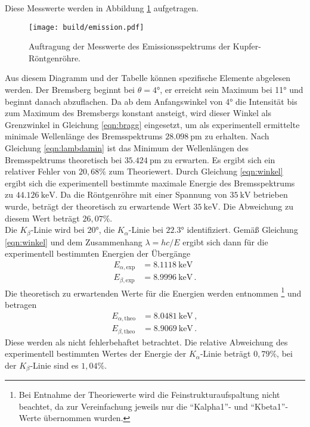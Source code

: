 Diese Messwerte werden in Abbildung \ref{fig:emission} aufgetragen.

\begin{figure}
  \centering
  \texttt{[image: build/emission.pdf]}
  \caption{Auftragung der Messwerte des Emissionsspektrums der Kupfer-Röntgenröhre.}
  \label{fig:emission}
\end{figure}

Aus diesem Diagramm und der Tabelle können spezifische Elemente abgelesen werden.
Der Bremsberg beginnt bei $\theta = 4°$, er erreicht sein Maximum bei 11° und beginnt danach abzuflachen.
Da ab dem Anfangswinkel von 4° die Intensität bis zum Maximum des Bremsbergs konstant
ansteigt, wird dieser Winkel als Grenzwinkel in Gleichung \eqref{eqn:bragg} eingesetzt, um als experimentell ermittelte minimale
Wellenlänge des Bremsspektrums $\SI{28.098}{\pico\meter}$ zu erhalten. Nach Gleichung
\eqref{eqn:lambdamin} ist das Minimum der Wellenlängen des Bremsspektrums theoretisch
bei $\SI{35.424}{\pico\meter}$ zu erwarten. Es ergibt sich ein relativer Fehler von
$20{,}68\%$ zum Theoriewert. Durch Gleichung \eqref{eqn:winkel} ergibt sich
die experimentell bestimmte maximale Energie des Bremsspektrums zu $\SI{44.126}{\kilo\electronvolt}$.
Da die Röntgenröhre mit einer Spannung von $\SI{35}{\kilo\volt}$ betrieben wurde,
beträgt der theoretisch zu erwartende Wert $\SI{35}{\kilo\electronvolt}$. Die Abweichung
zu diesem Wert beträgt $26{,}07\%$. \\
Die $K_\beta$-Linie wird bei $20°$, die $K_\alpha$-Linie bei $22.3°$ identifiziert.
Gemäß Gleichung \eqref{eqn:winkel} und dem Zusammenhang $\lambda = hc/E$ ergibt
sich dann für die experimentell bestimmten Energien der Übergänge
\begin{align*}
  E_{\alpha,\text{exp}} &= \SI{8.1118}{\kilo\electronvolt} \,\\
  E_{\beta,\text{exp}} &= \SI{8.9996}{\kilo\electronvolt} \,.
\end{align*}
Die theoretisch zu erwartenden Werte für die Energien werden \cite{xraydata} entnommen \footnote{
Bei Entnahme der Theoriewerte wird die Feinstrukturaufspaltung nicht beachtet, da zur Vereinfachung
jeweils nur die \enquote{Kalpha1}- und \enquote{Kbeta1}-Werte übernommen wurden.
} und
betragen
\begin{align*}
  E_{\alpha,\text{theo}} &= \SI{8.0481}{\kilo\electronvolt} \,,\\
  E_{\beta,\text{theo}} &= \SI{8.9069}{\kilo\electronvolt} \,.
\end{align*}
Diese werden als nicht fehlerbehaftet betrachtet.
Die relative Abweichung des experimentell bestimmten Wertes der Energie
der $K_\alpha$-Linie beträgt $0{,}79\%$, bei der $K_\beta$-Linie sind es $1{,}04\%$.

